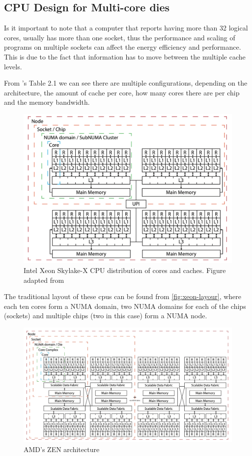 \subsection{CPU Design for Multi-core dies}
Is it important to note that a computer that reports having more than 32 logical cores, usually has more than one socket, thus the performance and scaling of programs on multiple sockets can affect the energy efficiency and performance. This is due to the fact that information has to move between the multiple cache levels. 

From \cite{phd-apmtrlk}'s Table 2.1 we can see there are multiple configurations, depending on the architecture, the amount of cache per core, how many cores there are per chip and the memory bandwidth.


\begin{figure}
    \centering
    \includegraphics[width=0.75\linewidth]{img/xeon-architecture.png}
    \caption{Intel Xeon Skylake-X CPU distribution of cores and caches. Figure adapted from \autocite{phd-apmtrlk}}
    \label{fig:xeon-layour}
\end{figure}

The traditional layout of these \glspl{cpu} can be found from \autoref{fig:xeon-layour}, where each ten cores form a \gls{NUMA} domain, two \gls{NUMA} domains for each of the chips (sockets) and multiple chips (two in this case) form a \gls{NUMA} node.


\begin{figure}
    \centering
    \includegraphics[width=0.85\linewidth]{img/ccx-zen2-layout.png}
    \caption{AMD's ZEN architecture}
    \label{fig:zen2-architecture}
\end{figure}

